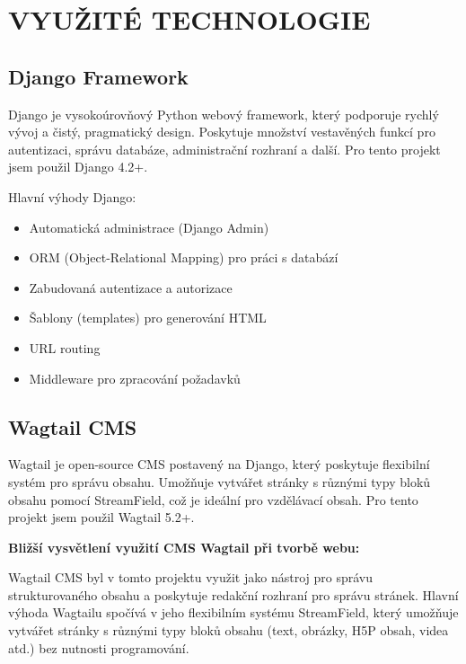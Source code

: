 \documentclass[a4paper,12pt]{article}
\begin{document}
\newpage

\section{VYUŽITÉ TECHNOLOGIE}

\subsection{Django Framework}

Django je vysokoúrovňový Python webový framework, který podporuje rychlý vývoj a čistý, pragmatický design. Poskytuje množství vestavěných funkcí pro autentizaci, správu databáze, administrační rozhraní a další. Pro tento projekt jsem použil Django 4.2+.

Hlavní výhody Django:
\begin{itemize}
    \item Automatická administrace (Django Admin)
    \item ORM (Object-Relational Mapping) pro práci s databází
    \item Zabudovaná autentizace a autorizace
    \item Šablony (templates) pro generování HTML
    \item URL routing
    \item Middleware pro zpracování požadavků
\end{itemize}

\subsection{Wagtail CMS}

Wagtail je open-source CMS postavený na Django, který poskytuje flexibilní systém pro správu obsahu. Umožňuje vytvářet stránky s různými typy bloků obsahu pomocí StreamField, což je ideální pro vzdělávací obsah. Pro tento projekt jsem použil Wagtail 5.2+.

\textbf{Bližší vysvětlení využití CMS Wagtail při tvorbě webu:}

Wagtail CMS byl v tomto projektu využit jako nástroj pro správu strukturovaného obsahu a poskytuje redakční rozhraní pro správu stránek. Hlavní výhoda Wagtailu spočívá v jeho flexibilním systému StreamField, který umožňuje vytvářet stránky s různými typy bloků obsahu (text, obrázky, H5P obsah, videa atd.) bez nutnosti programování.
\end{document}
